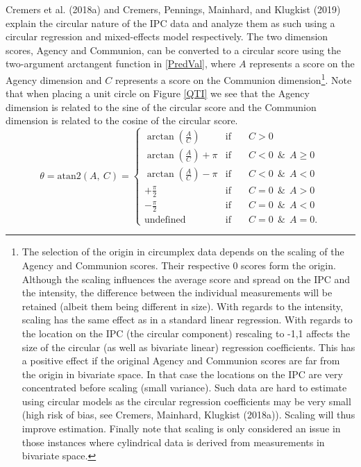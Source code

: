 \documentclass[man,mask]{apa6}
\let\rmarkdownfootnote\footnote%
\def\footnote{\protect\rmarkdownfootnote}
\begin{document}
\indent Cremers et al. (2018a) and Cremers, Pennings, Mainhard, and Klugkist (2019) explain the circular nature of the IPC data and analyze them as such using a circular regression and mixed-effects model respectively. The two dimension
scores, Agency and Communion, can be converted to a circular score using the
two-argument arctangent function in \eqref{PredVal}, where \(A\) represents a
score on the Agency dimension and \(C\) represents a score on the Communion
dimension\footnote{The selection of the origin in circumplex data depends on
the scaling of the Agency and Communion scores. Their respective 0 scores form the
origin. Although the scaling influences the average score and spread on the IPC and the intensity, the difference between the individual measurements will be retained (albeit them being different in size). With regards to the intensity, scaling has the same effect as in a standard linear regression. With regards to the location on the IPC (the circular component) rescaling to -1,1 affects the size of the circular (as well as bivariate linear) regression coefficients. This has a positive effect if the original Agency and Communion scores are far from the origin in bivariate space. In that case the locations on the IPC are very concentrated before scaling (small variance). Such data are hard to estimate using circular models as the circular regression coefficients may be very small (high risk of bias, see Cremers, Mainhard, Klugkist (2018a)). Scaling will thus improve estimation. Finally note that scaling is only considered an issue in those instances where cylindrical data is derived from measurements in bivariate space.}. Note that
when placing a unit circle on Figure \ref{QTI} we see that the Agency dimension
is related to the sine of the circular score and the Communion dimension is
related to the cosine of the circular score.
\begin{equation}\label{PredVal}
\theta          = \text{atan2}\left(A, \: C\right)  =
\left\{{\begin{array}{lcl}
                                                                       \arctan\left(\frac{A}{C}\right) & \text{if}  \quad&C > 0 \\
\arctan\left(\frac{A}{C}\right) + \pi & \text{if}  \quad& C  <  0  \:\: \&\:\: A \geq 0\\
 \arctan\left(\frac{A}{C}\right) - \pi & \text{if}  \quad&C  <  0 \:\:  \&\:\:A  < 0\\
 +\frac{\pi}{2} & \text{if}  \quad& C  =  0  \:\: \&\:\:A > 0\\
 -\frac{\pi}{2} & \text{if}  \quad& C =  0  \:\: \&\:\:A < 0\\
 \text{undefined} & \text{if} \quad& C =  0   \:\: \&\:\:A = 0.
 \end{array}}
\right.
\end{equation}
\end{document}
